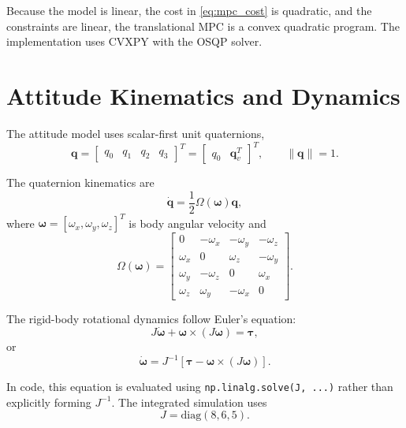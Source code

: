 \documentclass[11pt]{article}
\begin{document}
Because the model is linear, the cost in \eqref{eq:mpc_cost} is quadratic, and the constraints are linear, the translational MPC is a convex quadratic program. The implementation uses CVXPY with the OSQP solver.

\section{Attitude Kinematics and Dynamics}

The attitude model uses scalar-first unit quaternions,
\begin{equation}
    \bm{q}
    =
    \begin{bmatrix}
    q_0 & q_1 & q_2 & q_3
    \end{bmatrix}^{T}
    =
    \begin{bmatrix}
    q_0 & \bm{q}_v^{T}
    \end{bmatrix}^{T},
    \qquad
    \|\bm{q}\| = 1.
\end{equation}

The quaternion kinematics are
\begin{equation}
    \dot{\bm{q}}
    =
    \frac{1}{2}\Omega(\bm{\omega})\bm{q},
\end{equation}
where \(\bm{\omega} = [\omega_x,\omega_y,\omega_z]^T\) is body angular velocity and
\begin{equation}
\Omega(\bm{\omega})
=
\begin{bmatrix}
0 & -\omega_x & -\omega_y & -\omega_z\\
\omega_x & 0 & \omega_z & -\omega_y\\
\omega_y & -\omega_z & 0 & \omega_x\\
\omega_z & \omega_y & -\omega_x & 0
\end{bmatrix}.
\end{equation}

The rigid-body rotational dynamics follow Euler's equation:
\begin{equation}
    J\dot{\bm{\omega}} + \bm{\omega}\times(J\bm{\omega}) = \bm{\tau},
\end{equation}
or
\begin{equation}
    \dot{\bm{\omega}}
    =
    J^{-1}
    \left[
    \bm{\tau}
    -
    \bm{\omega}\times(J\bm{\omega})
    \right].
\end{equation}

In code, this equation is evaluated using \texttt{np.linalg.solve(J, ...)} rather than explicitly forming \(J^{-1}\). The integrated simulation uses
\begin{equation}
    J = \mathrm{diag}(8,6,5).
\end{equation}
\end{document}
